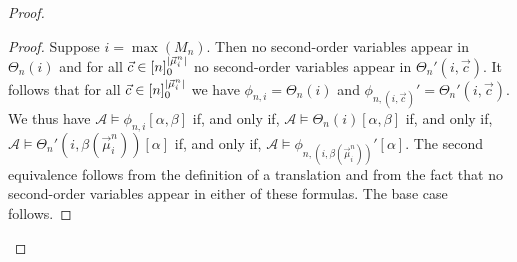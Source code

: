 \documentclass[../main/thesis.tex]{subfiles}
\begin{document}
\begin{proof}
\begin{proof}

    Suppose $i = \max(M_n)$. Then no second-order variables appear in
    $\Theta_n(i)$ and for all $\vec{c} \in [n]^{\vert
      \vec{\mu}^n_i\vert}_0$ no second-order variables appear in $\Theta_n'(i,
    \vec{c})$. It follows that for all $\vec{c} \in [n]^{\vert
      \vec{\mu}^n_i\vert}_0$ we have $\phi_{n, i} = \Theta_n(i)$ and $\phi_{n, (i,
      \vec{c})}' = \Theta_{n}'(i, \vec{c})$. We thus have $\mathcal{A} \models
    \phi_{n, i}[\alpha, \beta]$ if, and only if, $\mathcal{A} \models
    \Theta_{n}(i)[\alpha, \beta]$ if, and only if, $\mathcal{A} \models
    \Theta_{n}'(i, \beta(\vec{\mu}^n_i)) [\alpha]$ if, and only if, $\mathcal{A}
    \models \phi_{n, (i,\beta(\vec{\mu}^n_i))}'[\alpha]$. The second equivalence
    follows from the definition of a translation and from the fact that no
    second-order variables appear in either of these formulas. The base case
    follows.


\end{proof}
\end{proof}
\end{document}
